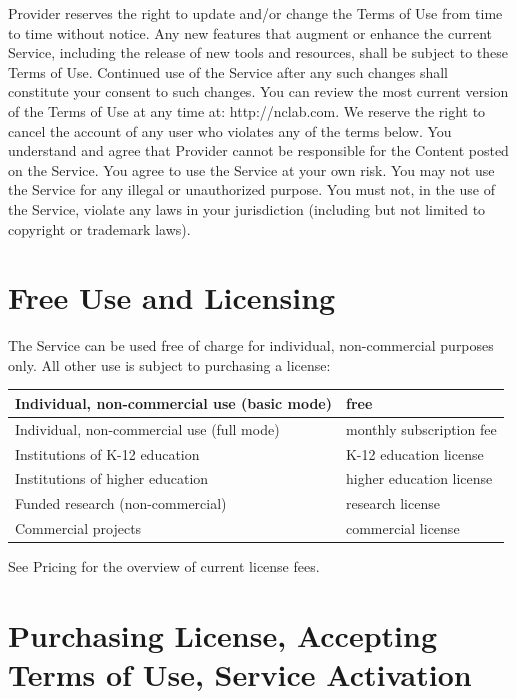 \documentclass{article}
\begin{document}
\noindent
Provider reserves the right to update and/or change the Terms of Use from time to time without notice. Any new features that augment or enhance the current Service, including the release of new tools and resources, shall be subject to these Terms of Use. Continued use of the Service after any such changes shall constitute your consent to such changes. You can review the most current version of the Terms of Use at any time at: http://nclab.com. We reserve the right to cancel the account of any user who violates any of the terms below. You understand and agree that Provider cannot be responsible for the Content posted on the Service. You agree to use the Service at your own risk. You may not use the Service for any illegal or unauthorized purpose. You must not, in the use of the Service, violate any laws in your jurisdiction (including but not limited to copyright or trademark laws).


\section*{Free Use and Licensing}

The Service can be used free of charge for individual, non-commercial purposes only. All other use is subject to purchasing a license:\\

\begin{center}
\begin{tabular}{|l|l|}
\hline
Individual, non-commercial use (basic mode) & free \\
\hline
Individual, non-commercial use (full mode) & monthly subscription fee\\
\hline
Institutions of K-12 education & K-12 education license \\
\hline
Institutions of higher education & higher education license\\
\hline
Funded research (non-commercial) & research license \\
\hline
Commercial projects & commercial license \\
\hline
\end{tabular}
\vspace{6mm}
\end{center}
See Pricing for the overview of current license fees. 

\section*{Purchasing License, Accepting Terms of Use, Service Activation}
\end{document}
